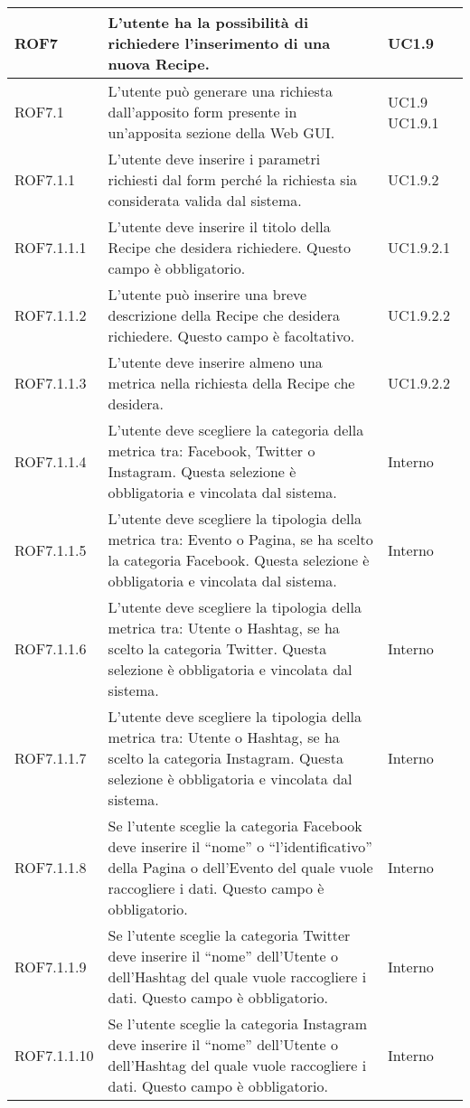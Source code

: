 \begin{center}
\begin{longtable}{| p{2.5cm} | p{8cm} | p{2cm} |}
		ROF7  & L'utente ha la possibilità di richiedere l'inserimento di una nuova Recipe. & UC1.9 \\
		\hline
		ROF7.1  & L'utente può generare una richiesta dall'apposito form presente in un'apposita sezione della Web GUI. & UC1.9 \newline UC1.9.1 \\
		\hline
		ROF7.1.1 & L'utente deve inserire i parametri richiesti dal form perché la richiesta sia considerata valida dal sistema. & UC1.9.2  \\
		\hline
		ROF7.1.1.1 & L'utente deve inserire il titolo della Recipe che desidera richiedere. Questo campo è obbligatorio. & UC1.9.2.1 \\
		\hline
		ROF7.1.1.2 & L'utente può inserire una breve descrizione della Recipe che desidera richiedere. Questo campo è facoltativo. & UC1.9.2.2 \\
		\hline
		ROF7.1.1.3 & L'utente deve inserire almeno una metrica nella richiesta della Recipe che desidera. & UC1.9.2.2 \\
		\hline
		ROF7.1.1.4 & L'utente deve scegliere la categoria della metrica tra: Facebook, Twitter o Instagram. Questa selezione è obbligatoria e vincolata dal sistema. & Interno \\
		\hline
		ROF7.1.1.5 & L'utente deve scegliere la tipologia della metrica tra: Evento o Pagina, se ha scelto la categoria Facebook. Questa selezione è obbligatoria e vincolata dal sistema. & Interno \\
		\hline
		ROF7.1.1.6 & L'utente deve scegliere la tipologia della metrica tra: Utente o Hashtag, se ha scelto la categoria Twitter. Questa selezione è obbligatoria e vincolata dal sistema. & Interno \\
		\hline
		ROF7.1.1.7 & L'utente deve scegliere la tipologia della metrica tra: Utente o Hashtag, se ha scelto la categoria Instagram. Questa selezione è obbligatoria e vincolata dal sistema. & Interno \\
		\hline
		ROF7.1.1.8 & Se l'utente sceglie la categoria Facebook deve inserire il ``nome'' o ``l'identificativo'' della Pagina o dell'Evento del quale vuole raccogliere i dati. Questo campo è obbligatorio. & Interno \\
		\hline
		ROF7.1.1.9 & Se l'utente sceglie la categoria Twitter deve inserire il ``nome'' dell'Utente o dell'Hashtag del quale vuole raccogliere i dati. Questo campo è obbligatorio. & Interno \\
		\hline
		ROF7.1.1.10 & Se l'utente sceglie la categoria Instagram deve inserire il ``nome'' dell'Utente o dell'Hashtag del quale vuole raccogliere i dati. Questo campo è obbligatorio. & Interno \\

\end{longtable}
\end{center}
